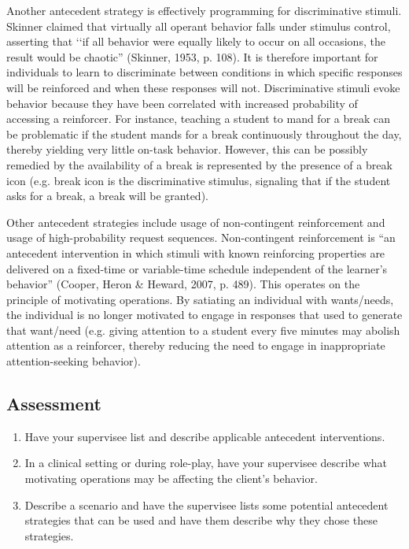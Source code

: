 Another antecedent strategy is effectively programming for discriminative stimuli. Skinner claimed that virtually all operant behavior falls under stimulus control, asserting that ‘‘if all behavior were equally likely to occur on all occasions, the result would be chaotic'' (Skinner, 1953, p. 108).  It is therefore important for individuals to learn to discriminate between conditions in which specific responses will be reinforced and when these responses will not. Discriminative stimuli evoke behavior because they have been correlated with increased probability of accessing a reinforcer. For instance, teaching a student to mand for a break can be problematic if the student mands for a break continuously throughout the day, thereby yielding very little on-task behavior. However, this can be possibly remedied by the availability of a break is represented by the presence of a break icon (e.g. break icon is the discriminative stimulus, signaling that if the student asks for a break, a break will be granted).  

Other antecedent strategies include usage of non-contingent reinforcement and usage of high-probability request sequences. Non-contingent reinforcement is ``an antecedent intervention in which stimuli with known reinforcing properties are delivered on a fixed-time or variable-time schedule independent of the learner's behavior'' (Cooper, Heron \& Heward, 2007, p. 489). This operates on the principle of motivating operations. By satiating an individual with wants/needs, the individual is no longer motivated to engage in responses that used to generate that want/need (e.g. giving attention to a student every five minutes may abolish attention as a reinforcer, thereby reducing the need to engage in inappropriate attention-seeking behavior). 
%
\subsection{Assessment}
\begin{enumerate}
\item Have your supervisee list and describe applicable antecedent interventions.
\item In a clinical setting or during role-play, have your supervisee describe what motivating operations may be affecting the client's behavior.
\item Describe a scenario and have the supervisee lists some potential antecedent strategies that can be used and have them describe why they chose these strategies.
\end{enumerate}
%

